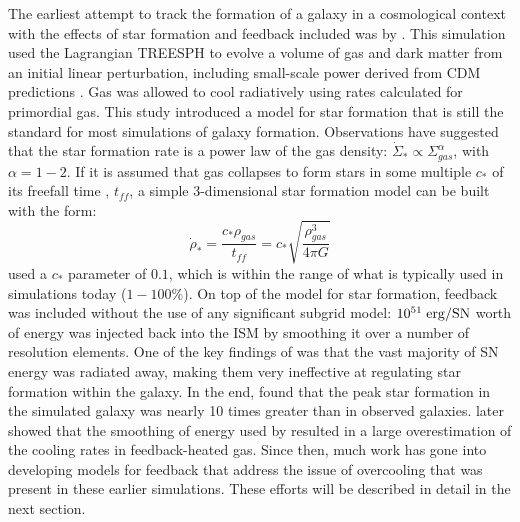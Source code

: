 The earliest attempt to track the formation of a galaxy in a cosmological
context with the effects of star formation and feedback included was by
\citet{Katz1992}.  This simulation used the Lagrangian TREESPH 
\citep{Hernquist1989} to evolve a volume of gas and dark matter from an initial
linear perturbation, including small-scale power derived from CDM predictions
\citep{Zeldovich1970,Peebles1982}.  Gas was allowed to cool radiatively using
rates calculated for primordial gas.  This study introduced a model for star
formation that is still the standard for most simulations of galaxy formation.
Observations \citep{Kennicutt1998} have suggested that the star formation rate
is a power law of the gas density: $\dot\Sigma_*\propto\Sigma_{gas}^\alpha$, with
$\alpha=1-2$.  If it is assumed that gas collapses to form stars in some
multiple $c_*$ of its freefall time \citep{Schmidt1959}, $t_{ff}$, a simple
3-dimensional star formation model can be built with the form:
\begin{equation}
    \dot\rho_* = \frac{c_*\rho_{gas}}{t_{ff}} = c_*\sqrt{\frac{\rho^3_{gas}}{4\pi G}}
\end{equation}
\citet{Katz1992} used a $c_*$ parameter of $0.1$, which is within the range of
what is typically used in simulations today ($1-100\%$).  On top of the model
for star formation, feedback was included without the use of any significant
subgrid model:  $10^{51}\;\rm{erg/SN}$ worth of energy was injected back into
the ISM by smoothing it over a number of resolution elements.  One of the key
findings of \citet{Katz1992} was that the vast majority of SN energy was
radiated away, making them very ineffective at regulating star formation within
the galaxy.  In the end, \citet{Katz1992} found that the peak star formation in
the simulated galaxy was nearly 10 times greater than in observed galaxies.
\citet{Thacker2000} later showed that the smoothing of energy used by
\citet{Katz1992} resulted in a large overestimation of the cooling rates in
feedback-heated gas. Since then, much work has gone into developing models for
feedback that address the issue of overcooling that was present in these
earlier simulations.  These efforts will be described in detail in the next
section.

